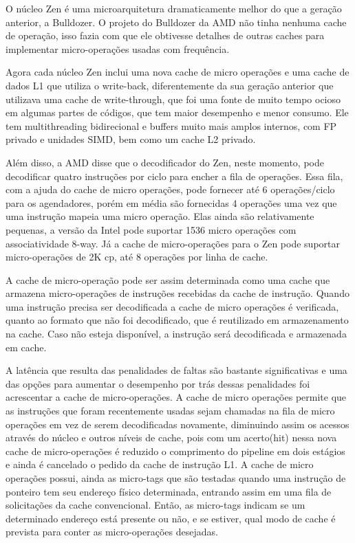 \documentclass[12pt]{article}
\begin{document}
O núcleo Zen é uma microarquitetura dramaticamente melhor do que a geração anterior, a Bulldozer. O projeto do Bulldozer da AMD não tinha nenhuma cache de operação, isso fazia com que ele obtivesse detalhes de outras caches para implementar micro-operações usadas com frequência.

Agora cada núcleo Zen inclui uma nova cache de micro operações e uma cache de dados L1 que utiliza o write-back, diferentemente da sua geração anterior que utilizava uma cache de write-through, que foi uma fonte de muito tempo ocioso em algumas partes de códigos, que tem maior desempenho e menor consumo. Ele tem multithreading bidirecional e buffers muito mais amplos internos, com FP privado e unidades SIMD, bem como um cache L2 privado.

Além disso, a AMD disse que o decodificador do Zen, neste momento, pode decodificar quatro instruções por ciclo para encher a fila de operações. Essa fila, com a ajuda do cache de micro operações, pode fornecer até 6 operações/ciclo para os agendadores, porém em média são fornecidas 4 operações uma vez que uma instrução mapeia uma micro operação. Elas ainda são relativamente pequenas, a versão da Intel pode suportar 1536 micro operações com associatividade 8-way. Já a cache de micro-operações para o Zen pode suportar micro-operações de 2K cp, até 8 operações por linha de cache.

A cache de micro-operação pode ser assim determinada como uma cache que armazena micro-operações de instruções recebidas da cache de instrução. Quando uma instrução precisa ser decodificada a cache de micro operações é verificada, quanto ao formato que não foi decodificado, que é reutilizado em armazenamento na cache. Caso não esteja disponível, a instrução será decodificada e armazenada em cache.

A latência que resulta das penalidades de faltas são bastante significativas e uma das opções para aumentar o desempenho por trás dessas penalidades foi acrescentar a cache de micro-operações. A cache de micro operações permite que as instruções que foram recentemente usadas sejam chamadas na fila de micro operações em vez de serem decodificadas novamente, diminuindo assim os acessos através do núcleo e outros níveis de cache, pois com um acerto(hit) nessa nova cache de micro-operações é reduzido o comprimento do pipeline em dois estágios e ainda é cancelado o pedido da cache de instrução L1. A cache de micro operações possui, ainda as micro-tags que são testadas quando uma instrução de ponteiro tem seu endereço físico determinada, entrando assim em uma fila de solicitações da cache convencional. Então, as micro-tags indicam se um determinado endereço está presente ou não, e se estiver, qual modo de cache é prevista para conter as micro-operações desejadas.
\end{document}
